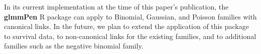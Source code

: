In its current implementation at the time of this paper's publication, the \textbf{glmmPen} R package can apply to Binomial, Gaussian, and Poisson families with canonical links. In the future, we plan to extend the application of this package to survival data, to non-canonical links for the existing families, and to additional families such as the negative binomial family. 









